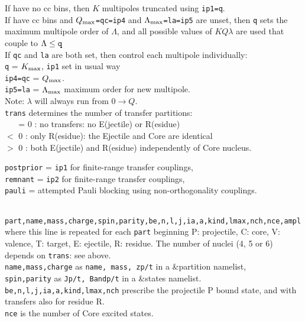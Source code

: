 \documentclass[11pt]{article}
\begin{document}
If have no cc bins, then $K$ multipoles truncated using {\tt ip1=q}.\\
If have cc bins and $Q_{\rm max}${\tt =qc=ip4} and
$\Lambda_{\rm max}${\tt =la=ip5} are unset, then
{\tt q} sets the maximum multipole order of $\Lambda$, and
 all possible values of  $KQ\lambda$ are used that couple to $\Lambda \le {\tt q}$\\
If {\tt qc} and {\tt la} are both set, then control each multipole
individually:\\
\hspace*{1cm} {\tt q}     = $K_{\rm max}$,  {\tt ip1} set in usual way\\
\hspace*{1cm} {\tt ip4=qc}  = $Q_{\rm max}$. \\
\hspace*{1cm} {\tt ip5=la} = $\Lambda_{\rm max}$ maximum order for new
multipole.\\
\hspace*{1cm}  Note: $\lambda$ will always run from $0\rightarrow Q$.\\


{\tt trans} determines the number of transfer partitions:\\
~ ~   = 0 : no transfers: no E(jectile) or R(esidue)
\\    $<$ 0 : only R(esidue): the Ejectile and Core are identical
\\    $>$ 0 : both E(jectile) and R(esidue) independently of Core nucleus.

{\tt postprior} = {\tt ip1} for finite-range transfer couplings,\\
{\tt remnant} = {\tt ip2} for finite-range transfer couplings,\\
{\tt pauli} = attempted Pauli blocking using non-orthogonality couplings.


\\
{\tt part,name,mass,charge,spin,parity,be,n,l,j,ia,a,kind,lmax,nch,nce,ampl
}\\
where this line is repeated for each {\tt part} beginning P: projectile, C:
core, V: valence, T: target, E: ejectile, R: residue. The number of nuclei
(4, 5 or 6) depends on {\tt trans}: see above.\\
{\tt name,mass,charge} as {\tt name, mass, zp/t} in a \&partition namelist,\\
{\tt spin,parity} as {\tt Jp/t, Bandp/t} in a \&states namelist.\\
{\tt be,n,l,j,ia,a,kind,lmax,nch} prescribe the projectile P bound state,
and with transfers also for residue R.\\
{\tt nce} is the number of Core excited states.
\end{document}
